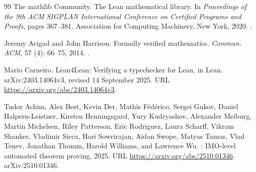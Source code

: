 \documentclass[a4paper,11pt,reqno]{amsart}
\theoremstyle{plain}
\theoremstyle{definition}
\theoremstyle{remark}
\begin{document}
\begin{thebibliography}{99}
The mathlib Community.
\newblock The Lean mathematical library.
\newblock In \emph{Proceedings of the 9th ACM SIGPLAN International
  Conference on Certified Programs and Proofs}, pages 367--381.
  Association for Computing Machinery, New York, 2020.
\newblock {}.

Jeremy Avigad and John Harrison.
\newblock Formally verified mathematics.
\newblock \emph{Commun. ACM}, 57 (4): 66--75, 2014.
\newblock {}.

Mario Carneiro.
\newblock Lean4Lean: Verifying a typechecker for Lean, in Lean.
\newblock arXiv:2403.14064v3, revised 14 September 2025.
\newblock URL \url{https://arxiv.org/abs/2403.14064v3}.

Tudor Achim, Alex Best, Kevin Der, Math{\"i}s F{\'e}d{\'e}rico, Sergei Gukov,
  Daniel Halpern-Leistner, Kirsten Henningsgard, Yury Kudryashov, Alexander
  Meiburg, Martin Michelsen, Riley Patterson, Eric Rodriguez, Laura Scharff,
  Vikram Shanker, Vladimir Sicca, Hari Sowrirajan, Aidan Swope, Matyas Tamas,
  Vlad Tenev, Jonathan Thomm, Harold Williams, and Lawrence Wu.
: {IMO}-level automated theorem proving, 2025.
\newblock URL \url{https://arxiv.org/abs/2510.01346}.
\newblock arXiv:2510.01346.

\end{thebibliography}
\end{document}
